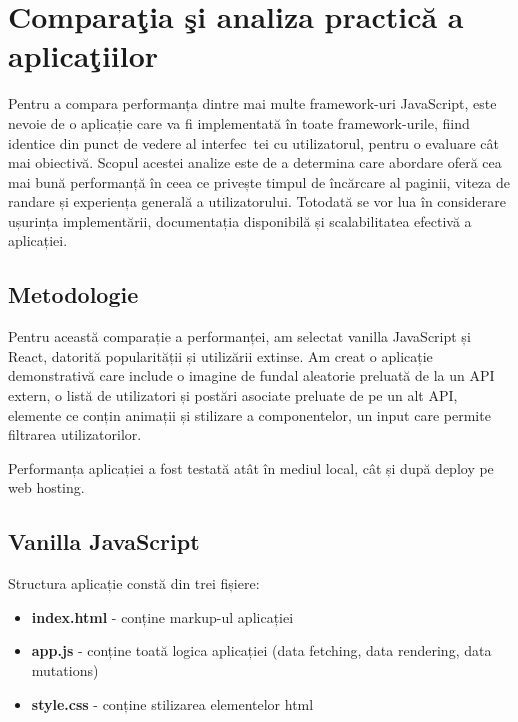 \documentclass[12pt, a4paper]{report}
\begin{document}
\section{Compara\c tia \c si analiza practică a aplica\c tiilor}

Pentru a compara performanța dintre mai multe framework-uri JavaScript, este nevoie de o aplicație care va fi implementată în toate framework-urile, fiind identice din punct de vedere al interfec\ tei cu utilizatorul, pentru o evaluare cât mai obiectivă. Scopul acestei analize este de a determina care abordare oferă cea mai bună performanță în ceea ce privește timpul de încărcare al paginii, viteza de randare și experiența generală a utilizatorului. Totodată se vor lua în considerare ușurința implementării, documentația disponibilă și scalabilitatea efectivă a aplicației.

\subsection{Metodologie}

Pentru această comparație a performanței, am selectat vanilla JavaScript și React, datorită popularității și utilizării extinse. Am creat o aplicație demonstrativă care include o imagine de fundal aleatorie preluată de la un API extern, o listă de utilizatori și postări asociate preluate de pe un alt API, elemente ce conțin animații și stilizare a componentelor, un input care permite filtrarea utilizatorilor.

Performanța aplicației a fost testată atât în mediul local, cât și după deploy pe web hosting.

\subsection{Vanilla JavaScript}
Structura aplicație constă din trei fișiere:
\begin{itemize}
	\item \textbf{index.html} - conține markup-ul aplicației
	\item \textbf{app.js} - conține toată logica aplicației (data fetching, data rendering, data mutations)
	\item \textbf{style.css} - conține stilizarea elementelor html
\end{itemize}
\end{document}

